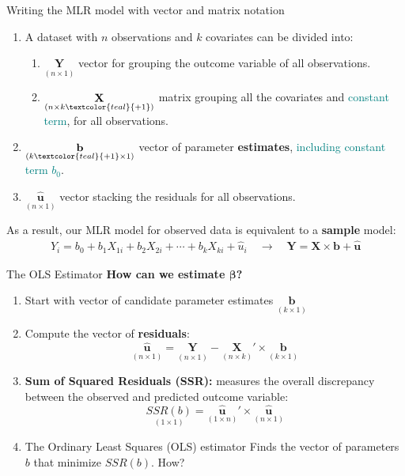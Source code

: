 \documentclass[11pt, aspectratio = 169]{beamer}
\begin{document}
\begin{frame}[fragile]{Writing the MLR model with vector and matrix notation}
    \begin{enumerate}
        \item A dataset with $n$ observations and $k$ covariates can be divided into:
        \begin{enumerate}
            \item $\underset{(n \times 1)}{\textbf{Y}}$ vector for grouping the outcome variable of all observations.  
            \item $\underset{(n \times k\textcolor{teal}{+1})}{\textbf{X}}$ matrix grouping all the covariates and \textcolor{teal}{constant term}, for all observations.
        \end{enumerate}
        \pause
        \item $\underset{(k\textcolor{teal}{+1} \times 1)}{\textbf{b}}$ vector of parameter \textbf{estimates}, \textcolor{teal}{including constant term $b_0$}.
        \pause
        \item $\underset{(n \times 1)}{\hat{\mathbf{u}}}$ vector stacking the residuals for all observations.
    \end{enumerate}
    \pause
    As a result, our MLR model for observed data is equivalent to a \textbf{sample} model:
    \begin{align*}
    Y_i = b_0 + b_1 X_{1i} + b_2 X_{2i} + \cdots + b_k X_{ki} + \hat{u}_i \quad \rightarrow \quad
    \textbf{Y} = \textbf{X} \times \textbf{b} + \hat{\mathbf{u}}
    \end{align*}
\end{frame}

\begin{frame}{The OLS Estimator}
\textbf{How can we estimate $\boldsymbol{\beta}$?}
\\
\pause
\begin{enumerate}
    \item Start with vector of candidate parameter estimates $\underset{(k \times 1)}{\textbf{b}}$
    \pause
    \item Compute the vector of \textbf{residuals}: 
    $$
    \underset{(n \times 1)}{\hat{\mathbf{u}}} = \underset{(n \times 1)}{\textbf{Y}} - \underset{(n \times k)}{\textbf{X}} ' \times \underset{(k \times 1)}{\textbf{b}}
    $$ \pause
    \item \textbf{Sum of Squared Residuals (SSR):} measures the overall discrepancy between the observed and predicted outcome variable:
    $$
    \underset{(1 \times 1)}{SSR(b)} = \underset{(1 \times n)}{\hat{\mathbf{u}}} ' \times \underset{(n \times 1)}{\hat{\mathbf{u}}}
    $$ \pause
    \item The Ordinary Least Squares (OLS) estimator Finds the vector of parameters $b$ that minimize $SSR(b)$. How?
\end{enumerate}
\end{frame}
\end{document}
